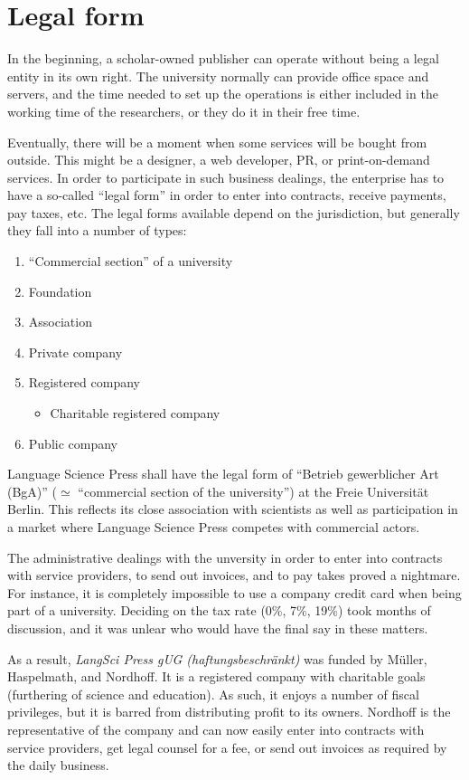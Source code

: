 \documentclass[nonflat,smallfont
]{langsci/langscibook}
\newcommand{\background}[1]{ 
  \vspace{5mm}
  \renewcommand{\tblslinecolour}{lsDarkBlue}
  \tblssy[red]{explore2}{Background}{\vspace*{-5mm}#1}
}
\newcommand{\langscisolution}[1]{
  \renewcommand{\tblslinecolour}{lsLightBlue}
  \tblssy{langsci}{LangSci solution}{\vspace*{-5mm}#1}
}
\newcommand{\evaluation}[1]{
  \renewcommand{\tblslinecolour}{lsLightOrange}
  \tblssy{receipt}{Evaluation}{\vspace*{-5mm}#1}
}
\renewcommand{\tblssy}[4][black!12]{%
  \renewcommand{\langscisymbol}{#2}\renewcommand{\tblsboxcolor}{#1}
  \begin{mdframed}[style=yellowexercise,frametitle={#3}]
    #4
  \end{mdframed}
}
\begin{document}
\section{Legal form}
\vspace*{5mm}
\background{In the beginning, a scholar-owned publisher can operate without being a legal entity in its own right. The university normally can provide office space and servers, and the time needed to set up the operations is either included in the working time of the researchers, or they do it in their free time. 

Eventually, there will be a moment when some services will be bought from outside. This might be a designer, a web developer, PR, or print-on-demand services. In order to participate in such business dealings, the enterprise has to have a so-called ``legal form'' in order to enter into contracts, receive payments, pay taxes, etc. The legal forms available depend on the jurisdiction, but generally they fall into a number of types:

\begin{enumerate}
 \item ``Commercial section'' of a university
 \item Foundation 
 \item Association 
 \item Private company
 \item Registered company 
 \begin{itemize}
  \item Charitable registered company
 \end{itemize}
 \item Public company 
\end{enumerate} 
}
\langscisolution{
Language Science Press shall have the legal form of ``Betrieb gewerblicher Art (BgA)'' ($\simeq$ ``commercial section of the university'') at the Freie Universität Berlin.
This reflects its close association with scientists as well as participation in a market where Language Science Press competes with commercial actors. 
}
\evaluation{
The administrative dealings with the unversity in order to enter into contracts with service providers, to send out invoices, and to pay takes proved a nightmare. For instance, it is completely impossible to use a company credit card when being part of a university. Deciding on the tax rate (0\%, 7\%, 19\%) took months of discussion, and it was unlear who would have the final say in these matters. 

As a result, \textit{LangSci Press gUG (haftungsbeschränkt)} was funded by Müller, Haspelmath, and Nordhoff. It is a registered company with charitable goals (furthering of science and education). As such, it enjoys a number of fiscal privileges, but it is barred from distributing profit to its owners. Nordhoff is the representative of the company and can now easily enter into contracts with service providers, get legal counsel for a fee, or send out invoices as required by the daily business. 
}
\end{document}
